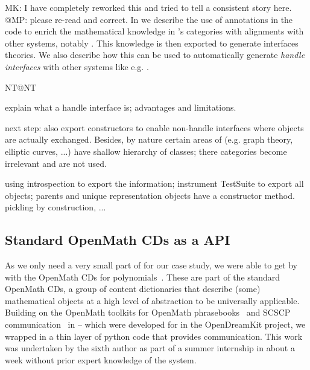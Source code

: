 \begin{newpart}{MK: I have completely reworked this and tried to tell a consistent story
    here. @MP: please re-read and correct.}
In \cite{DehKohKon:iop16} we describe the use of annotations in the code to enrich the
mathematical knowledge in \Sage's categories with alignments with other systems, notably
\MMT. This knowledge is then exported to generate interfaces theories. We also describe how
this can be used to automatically generate \emph{handle interfaces} with other systems
like e.g. \GAP.
\begin{todolist}{NT@NT}
\item explain what a handle interface is; advantages and limitations.
\item next step: also export constructors to enable non-handle interfaces where objects
  are actually exchanged. Besides, by nature certain areas of \Sage (e.g. graph theory,
  elliptic curves, ...) have shallow hierarchy of classes; there categories become
  irrelevant and are not used. 
\item using introspection to export the information; instrument TestSuite to export all
  objects; parents and unique representation objects have a constructor method. pickling
  by construction, ...
\end{todolist}

\subsection{Standard OpenMath CDs as a \Singular API}

As we only need a very small part of \Singular for our case study, we were able to get by
with the OpenMath CDs for polynomials~\cite{OMCD:poly:on}. These are part of the standard
OpenMath CDs, a group of content dictionaries that describe (some) mathematical objects at
a high level of abstraction to be universally applicable. Building on the OpenMath
toolkits for OpenMath phrasebooks~\cite{py-openmath:on} and SCSCP
communication~\cite{py-scscp:on} in \Python -- which were developed for \Sage in the
OpenDreamKit project, we wrapped \Singular in a thin layer of python code that provides
\SCSCP communication. This work was undertaken by the sixth author as part of a summer
internship in about a week without prior expert knowledge of the system.
\end{newpart}

